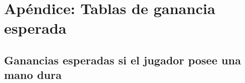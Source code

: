 \documentclass[12pt,a4paper,]{book}
\title{}
\author{Nombre Completo Autor}
\date{18/11/2021}
\def\ifdoblecara{} %
\def\ifprincipal{} %
\let\ifprincipal\undefined %
\numberwithin{dummy}{section}
\theoremstyle{ocrenumbox}
\theoremstyle{blacknumex}
\theoremstyle{blacknumbox}
\theoremstyle{ocrenum}
\theoremstyle{ocrenum}
\begin{document}




\raggedbottom

\ifdefined\ifprincipal
\else
\setlength{\parindent}{1em}
\pagestyle{fancy}
\setcounter{tocdepth}{4}
\tableofcontents

\fi

\ifdefined\ifdoblecara
\fancyhead{}{}
\fancyhead[LE,RO]{\scriptsize\rightmark}
\fancyfoot[LO,RE]{\scriptsize\slshape \leftmark}
\fancyfoot[C]{}
\fancyfoot[LE,RO]{\footnotesize\thepage}
\else
\fancyhead{}{}
\fancyhead[RO]{\scriptsize\rightmark}
\fancyfoot[LO]{\scriptsize\slshape \leftmark}
\fancyfoot[C]{}
\fancyfoot[RO]{\footnotesize\thepage}
\fi

\renewcommand{\headrulewidth}{0.4pt}
\renewcommand{\footrulewidth}{0.4pt}

\hypertarget{apuxe9ndice-tablas-de-ganancia-esperada}{%
\chapter{Apéndice: Tablas de ganancia
esperada}\label{apuxe9ndice-tablas-de-ganancia-esperada}}

\hypertarget{ganancias-esperadas-si-el-jugador-posee-una-mano-dura}{%
\section{Ganancias esperadas si el jugador posee una mano
dura}\label{ganancias-esperadas-si-el-jugador-posee-una-mano-dura}}

\begingroup\fontsize{12}{14}\selectfont
\end{document}
